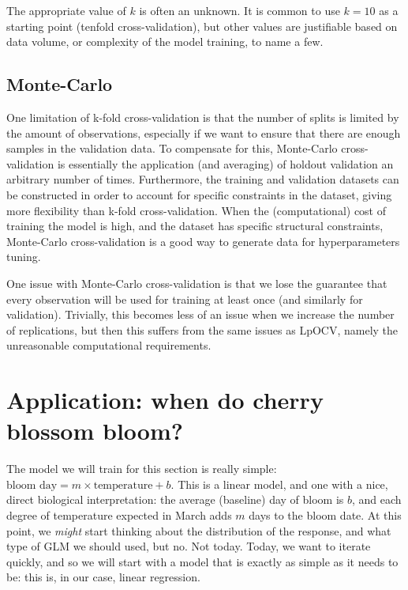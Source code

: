\documentclass[
  letterpaper,
]{scrbook}
\begin{document}
The appropriate value of \(k\) is often an unknown. It is common to use
\(k = 10\) as a starting point (tenfold cross-validation), but other
values are justifiable based on data volume, or complexity of the model
training, to name a few.

\subsection{Monte-Carlo}\label{monte-carlo}

One limitation of k-fold cross-validation is that the number of splits
is limited by the amount of observations, especially if we want to
ensure that there are enough samples in the validation data. To
compensate for this, Monte-Carlo cross-validation is essentially the
application (and averaging) of holdout validation an arbitrary number of
times. Furthermore, the training and validation datasets can be
constructed in order to account for specific constraints in the dataset,
giving more flexibility than k-fold cross-validation. When the
(computational) cost of training the model is high, and the dataset has
specific structural constraints, Monte-Carlo cross-validation is a good
way to generate data for hyperparameters tuning.

One issue with Monte-Carlo cross-validation is that we lose the
guarantee that every observation will be used for training at least once
(and similarly for validation). Trivially, this becomes less of an issue
when we increase the number of replications, but then this suffers from
the same issues as LpOCV, namely the unreasonable computational
requirements.

\section{Application: when do cherry blossom
bloom?}\label{application-when-do-cherry-blossom-bloom}

The model we will train for this section is really simple:
\(\text{bloom day} = m \times \text{temperature} + b\). This is a linear
model, and one with a nice, direct biological interpretation: the
average (baseline) day of bloom is \(b\), and each degree of temperature
expected in March adds \(m\) days to the bloom date. At this point, we
\emph{might} start thinking about the distribution of the response, and
what type of GLM we should used, but no. Not today. Today, we want to
iterate quickly, and so we will start with a model that is exactly as
simple as it needs to be: this is, in our case, linear regression.
\end{document}
